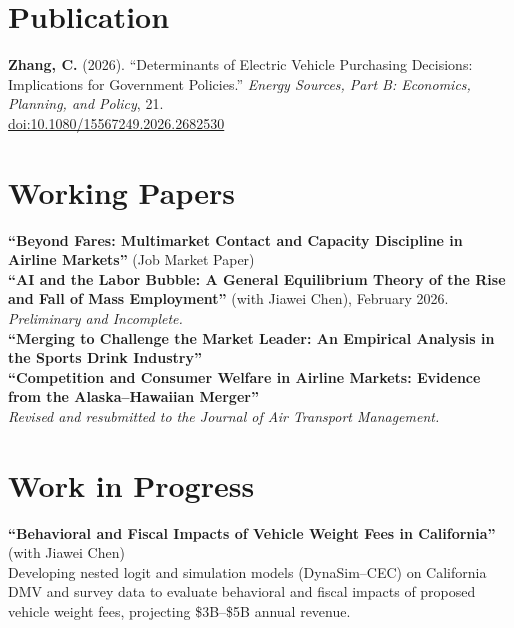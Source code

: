 \documentclass[11pt,letterpaper]{article}
\begin{document}
\section{Publication}
\textbf{Zhang, C.} (2026). ``Determinants of Electric Vehicle Purchasing Decisions: Implications for Government Policies.'' \textit{Energy Sources, Part B: Economics, Planning, and Policy}, 21.\\
\href{https://doi.org/10.1080/15567249.2026.2682530}{doi:10.1080/15567249.2026.2682530}

\section{Working Papers}
\textbf{``Beyond Fares: Multimarket Contact and Capacity Discipline in Airline Markets''} (Job Market Paper)\\[3pt]

\textbf{``AI and the Labor Bubble: A General Equilibrium Theory of the Rise and Fall of Mass Employment''} (with Jiawei Chen), February 2026. \textit{Preliminary and Incomplete.}\\[3pt]

\textbf{``Merging to Challenge the Market Leader: An Empirical Analysis in the Sports Drink Industry''}\\[3pt]

\textbf{``Competition and Consumer Welfare in Airline Markets: Evidence from the Alaska--Hawaiian Merger''}\\
\textit{Revised and resubmitted to the Journal of Air Transport Management.}

\section{Work in Progress}
\textbf{``Behavioral and Fiscal Impacts of Vehicle Weight Fees in California''} (with Jiawei Chen)\\
Developing nested logit and simulation models (DynaSim--CEC) on California DMV and survey data to evaluate behavioral and fiscal impacts of proposed vehicle weight fees, projecting \$3B--\$5B annual revenue.
\end{document}
